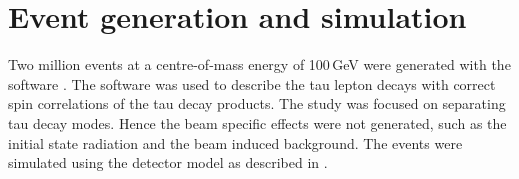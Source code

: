 \section{Event generation and simulation}
\label{sec:tauDecayModes}


Two million \eeToTauTau events at a centre-of-mass energy of 100\,GeV were generated with the \WHIZARD software \cite{whizard}.  The \TAUOLA software \cite{Jadach:1993hs} was used to describe the tau lepton decays with correct spin correlations of the tau decay products. The study was focused on separating tau decay modes. Hence the beam specific effects were not generated, such as the initial state radiation and the beam induced background. The \eeToTauTau events were simulated using the \ILD detector model as described in .




